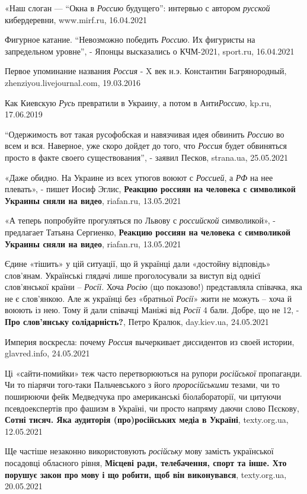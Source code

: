 «Наш слоган — \enquote{Окна в \emph{Россию} будущего}: интервью с автором \emph{русской}
кибердеревни, www.mirf.ru, 16.04.2021

Фигурное катание. \enquote{Невозможно победить \emph{Россию}. Их фигуристы на
запредельном уровне}, - Японцы высказались о КЧМ-2021, sport.ru, 16.04.2021

Первое упоминание названия \emph{Россия} - X век н.э. Константин
Багрянородный, zhenziyou.livejournal.com, 19.03.2016

Как Киевскую \emph{Русь} превратили в Украину, а потом в Анти\emph{Россию},
kp.ru, 17.06.2019

\enquote{Одержимость вот такая русофобская и навязчивая идея обвинить \emph{Россию} во всем и
вся. Наверное, уже скоро дойдет до того, что \emph{Россия} будет обвиняться просто в
факте своего существования}, - заявил Песков, strana.ua, 25.05.2021

«Даже обидно. На Украине из всех утюгов воюют с \emph{Россией}, а \emph{РФ} на нее плевать», - пишет Иосиф Эглис,
\textbf{Реакцию россиян на человека с символикой Украины сняли на видео}, riafan.ru, 13.05.2021

«А теперь попробуйте прогуляться по Львову с \emph{российской} символикой», - предлагает Татьяна Сергиенко,
\textbf{Реакцию россиян на человека с символикой Украины сняли на видео}, riafan.ru, 13.05.2021

Єдине «тішить» у цій ситуації, що й українці дали «достойну відповідь»
слов'янам. Українські глядачі лише проголосували за виступ від однієї
слов'янської країни – \emph{Росії}. Хоча \emph{Росію} (що показово!) представляла співачка,
яка не є слов'янкою. Але ж українці без «братньої \emph{Росії}» жити не можуть
– хоча й воюють із нею. Тому й дали співачці Маніжі від \emph{Росії} 4 бали.
Добре, що не 12, - \textbf{Про слов'янську солідарність?}, Петро Кралюк, day.kiev.ua,
24.05.2021

Империя воскресла: почему \emph{Россия} вычеркивает диссидентов из своей
истории, glavred.info, 24.05.2021

Ці «сайти-помийки» теж часто перетворюються на рупори \emph{російської}
пропаганди. Чи то піарячи того-таки Пальчевського з його \emph{проросійськими}
тезами, чи то поширюючи фейк Медведчука про американські біолабораторії, чи
цитуючи псевдоекспертів про фашизм в Україні, чи просто напряму даючи слово
Пєскову, \textbf{Сотні тисяч. Яка аудиторія (про)російських медіа в Україні},
texty.org.ua, 12.05.2021

Ще частіше незаконно використовують \emph{російську} мову замість української
посадовці обласного рівня, \textbf{Місцеві ради, телебачення, спорт та інше.
Хто порушує закон про мову і що робити, щоб він виконувався}, texty.org.ua,
20.05.2021

